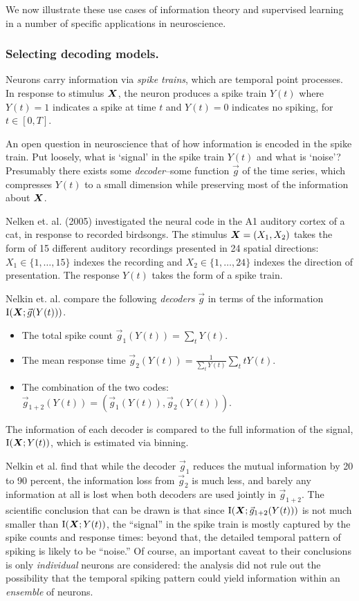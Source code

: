 We now illustrate these use cases of information theory and supervised
learning in a number of specific applications in neuroscience.

\subsubsection{Selecting decoding models.}
Neurons carry information via \emph{spike trains}, which are temporal
point processes.  In response to stimulus $\boldsymbol{X}$, the neuron produces a
spike train $Y(t)$ where $Y(t) = 1$ indicates a spike at time $t$ and
$Y(t) = 0$ indicates no spiking, for $t \in [0, T]$.

An open question in neuroscience that of how information is encoded in
the spike train.  Put loosely, what is `signal' in the spike train
$Y(t)$ and what is `noise'?  Presumably there exists
some \emph{decoder}--some function $\vec{g}$ of the time series, which
compresses $Y(t)$ to a small dimension while preserving most of the
information about $\boldsymbol{X}$.

Nelken et. al. (2005) investigated the neural code in the A1 auditory
cortex of a cat, in response to recorded birdsongs.  The stimulus $\boldsymbol{X}
= (X_1, X_2)$ takes the form of 15 different auditory recordings
presented in 24 spatial directions: $X_1 \in \{1,\hdots, 15\}$ indexes
the recording and $X_2 \in \{1,\hdots, 24\}$ indexes the direction of
presentation.  The response $Y(t)$ takes the form of a spike train.

Nelkin et. al. compare the following \emph{decoders} $\vec{g}$ in terms
of the information $\text{I}(\boldsymbol{X}; \vec{g}(Y(t)))$.
\begin{itemize}
\item The total spike count $\vec{g}_1(Y(t)) = \sum_t Y(t)$.
\item The mean response time $\vec{g}_2(Y(t)) = \frac{1}{\sum_t Y(t)} \sum_t t Y(t)$.
\item The combination of the two codes: $\vec{g}_{1+2}(Y(t)) = (\vec{g}_1(Y(t)), \vec{g}_2(Y(t)))$.
\end{itemize}
The information of each decoder is compared to the full information of
the signal, $\text{I}(\boldsymbol{X}; Y(t))$, which is estimated via binning.

Nelkin et al. find that while the decoder $\vec{g}_1$ reduces the
mutual information by 20 to 90 percent, the information loss from
$\vec{g}_2$ is much less, and barely any information at all is lost
when both decoders are used jointly in $\vec{g}_{1+2}$.  The
scientific conclusion that can be drawn is that since
$\text{I}(\boldsymbol{X}; \vec{g}_{1+2}(Y(t)))$ is not much smaller than
$\text{I}(\boldsymbol{X}; Y(t))$, the ``signal'' in the spike train is mostly
captured by the spike counts and response times: beyond that, the
detailed temporal pattern of spiking is likely to be ``noise.''  Of
course, an important caveat to their conclusions is
only \emph{individual} neurons are considered: the analysis did not
rule out the possibility that the temporal spiking pattern could yield
information within an \emph{ensemble} of neurons.


